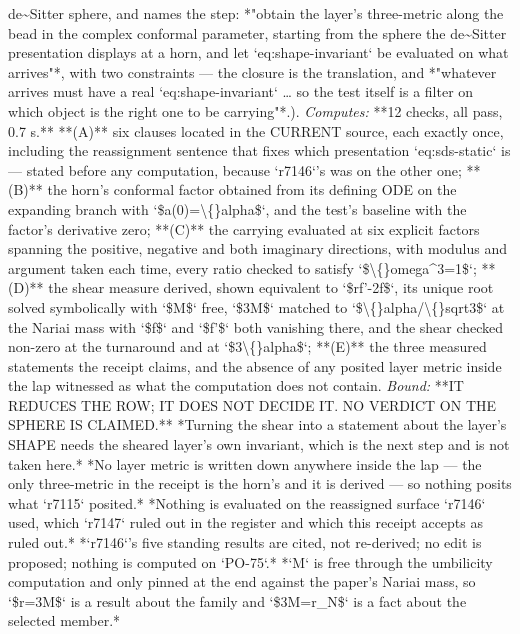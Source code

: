 \begin{description}
de\textasciitilde{}Sitter sphere, and names the step: *"obtain the layer's three-metric along the bead in the complex conformal parameter, starting from the sphere the de\textasciitilde{}Sitter presentation displays at a horn, and let `eq:shape-invariant` be evaluated on what arrives"*, with two constraints --- the closure is the translation, and *"whatever arrives must have a real `eq:shape-invariant` \ldots{} so the test itself is a filter on which object is the right one to be carrying"*.). 
\emph{Computes:} **12 checks, all pass, 0.7 s.** **(A)** six clauses located in the CURRENT source, each exactly once, including the reassignment sentence that fixes which presentation `eq:sds-static` is --- stated before any computation, because `r7146`'s was on the other one; **(B)** the horn's conformal factor obtained from its defining ODE on the expanding branch with `\$a(0)=\textbackslash\{\}alpha\$`, and the test's baseline with the factor's derivative zero; **(C)** the carrying evaluated at six explicit factors spanning the positive, negative and both imaginary directions, with modulus and argument taken each time, every ratio checked to satisfy `\$\textbackslash\{\}omega\textasciicircum{}3=1\$`; **(D)** the shear measure derived, shown equivalent to `\$rf'-2f\$`, its unique root solved symbolically with `\$M\$` free, `\$3M\$` matched to `\$\textbackslash\{\}alpha/\textbackslash\{\}sqrt3\$` at the Nariai mass with `\$f\$` and `\$f'\$` both vanishing there, and the shear checked non-zero at the turnaround and at `\$3\textbackslash\{\}alpha\$`; **(E)** the three measured statements the receipt claims, and the absence of any posited layer metric inside the lap witnessed as what the computation does not contain.
 \emph{Bound:}  **IT REDUCES THE ROW; IT DOES NOT DECIDE IT. NO VERDICT ON THE SPHERE IS CLAIMED.**  *Turning the shear into a statement about the layer's SHAPE needs the sheared layer's own invariant, which is the next step and is not taken here.*  *No layer metric is written down anywhere inside the lap --- the only three-metric in the receipt is the horn's and it is derived --- so nothing posits what `r7115` posited.*  *Nothing is evaluated on the reassigned surface `r7146` used, which `r7147` ruled out in the register and which this receipt accepts as ruled out.*  *`r7146`'s five standing results are cited, not re-derived; no edit is proposed; nothing is computed on `PO-75`.*  *`M` is free through the umbilicity computation and only pinned at the end against the paper's Nariai mass, so `\$r=3M\$` is a result about the family and `\$3M=r\_N\$` is a fact about the selected member.*

\end{description}
